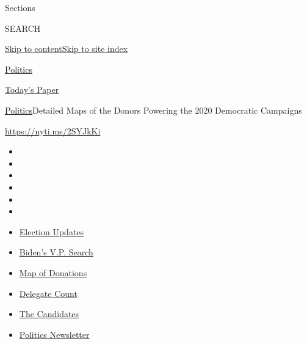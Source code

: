 Sections

SEARCH

\protect\hyperlink{site-content}{Skip to
content}\protect\hyperlink{site-index}{Skip to site index}

\href{https://www.nytimes.com/section/politics}{Politics}

\href{https://myaccount.nytimes.com/auth/login?response_type=cookie\&client_id=vi}{}

\href{https://www.nytimes.com/section/todayspaper}{Today's Paper}

\href{/section/politics}{Politics}\textbar{}Detailed Maps of the Donors
Powering the 2020 Democratic Campaigns

\url{https://nyti.ms/2SYJkKi}

\begin{itemize}
\item
\item
\item
\item
\item
\item
\end{itemize}

\begin{itemize}
\item
  \href{https://www.nytimes.com/2020/07/31/us/elections/biden-vs-trump.html?action=click\&pgtype=Article\&state=default\&region=TOP_BANNER\&context=storylines_menu}{Election
  Updates}
\item
  \href{https://www.nytimes.com/article/biden-vice-president-2020.html?action=click\&pgtype=Article\&state=default\&region=TOP_BANNER\&context=storylines_menu}{Biden's
  V.P. Search}
\item
  \href{https://www.nytimes.com/interactive/2020/07/24/us/politics/trump-biden-campaign-donors.html?action=click\&pgtype=Article\&state=default\&region=TOP_BANNER\&context=storylines_menu}{Map
  of Donations}
\item
  \href{https://www.nytimes.com/interactive/2020/us/elections/delegate-count-primary-results.html?action=click\&pgtype=Article\&state=default\&region=TOP_BANNER\&context=storylines_menu}{Delegate
  Count}
\item
  \href{https://www.nytimes.com/interactive/2019/us/politics/2020-presidential-candidates.html?action=click\&pgtype=Article\&state=default\&region=TOP_BANNER\&context=storylines_menu}{The
  Candidates}
\item
  \href{https://www.nytimes.com/newsletters/politics?action=click\&pgtype=Article\&state=default\&region=TOP_BANNER\&context=storylines_menu}{Politics
  Newsletter}
\end{itemize}

